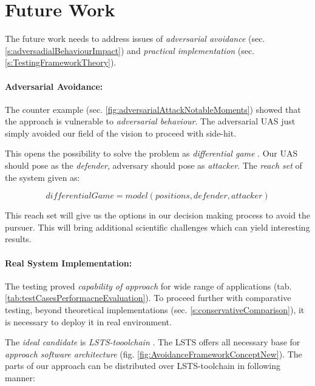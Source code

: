 \section{Future Work}\label{s:futureWork}

\noindent The future work needs to address issues of \emph{adversarial avoidance} (sec. \ref{s:adversadialBehaviourImpact}) and \emph{practical implementation} (sec. \ref{s:TestingFrameworkTheory}).

\paragraph{Adversarial Avoidance:} The counter example (sec. \ref{fig:adversarialAttackNotableMoments}) showed that the approach is vulnerable to \emph{adversarial behaviour}. The adversarial UAS just simply avoided our field of the vision to proceed with side-hit.

This opens the possibility to solve the problem as \emph{differential game} \cite{game1987,game1988}. Our UAS should pose as the \emph{defender}, adversary should pose as \emph{attacker}. The \emph{reach set} of the system given as:

\begin{equation*}
    differential Game = model(positions, defender, attacker)
\end{equation*}

\noindent This reach set  will give us the options in our decision making process to avoid the pursuer. This will bring additional scientific challenges which can yield interesting results.

\paragraph{Real System Implementation:} The testing proved \emph{capability of approach} for wide range of applications (tab. \ref{tab:testCasesPerformacneEvaluation}). To proceed further with comparative testing, beyond theoretical implementations (sec. \ref{s:conservativeComparison}), it is necessary to deploy it in real environment.

The \emph{ideal candidate} is \emph{LSTS-tooolchain} \cite{pinto2013lsts}. The LSTS offers all necessary base for \emph{approach software architecture} (fig. \ref{fig:AvoidanceFrameworkConceptNew}). The parts of our approach can be distributed over LSTS-toolchain in following manner:

